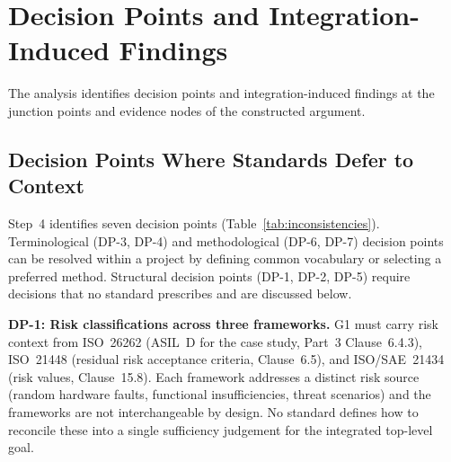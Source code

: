 \documentclass[runningheads]{llncs}
\newcommand{\new}[1]{#1}
\newcommand{\new}[1]{\textcolor{blue}{#1}}
\begin{document}
	\section{\new{Decision Points and Integration-Induced Findings}}
	\label{sec:results}
	
	The analysis identifies decision points and integration-induced findings at the junction points and evidence nodes of the constructed argument.
	
	\subsection{\new{Decision Points Where Standards Defer to Context}}
	\label{sec:inconsistencies}
	
	Step~4 identifies seven \new{decision points} (Table~\ref{tab:inconsistencies}). Terminological (DP-3, DP-4) and methodological (DP-6, DP-7) \new{decision points} can be resolved within a project by defining common vocabulary or selecting a preferred method. Structural \new{decision points} (DP-1, DP-2, DP-5) require decisions that no standard prescribes and are discussed below.
	
	\textbf{DP-1: \new{Risk classifications across three frameworks}.} G1 must carry risk context from ISO~26262 (ASIL~D for the case study, Part~3 Clause~6.4.3), ISO~21448 (residual risk acceptance criteria, Clause~6.5), and ISO/SAE~21434 (risk values, Clause~15.8). \new{Each framework addresses a distinct risk source (random hardware faults, functional insufficiencies, threat scenarios) and the frameworks are not interchangeable by design.} No standard defines how to reconcile these into a single sufficiency judgement \new{for the integrated top-level goal}.
	
\end{document}

